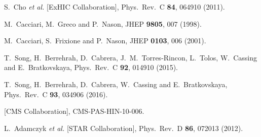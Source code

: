 \documentclass[twocolumn,aps,superscriptaddress,showpacs,nofootinbib,floatfix]{revtex4}
\begin{document}
\begin{thebibliography}{99}
  S.~Cho {\it et al.} [ExHIC Collaboration],
  Phys.\ Rev.\ C {\bf 84}, 064910 (2011).

  M.~Cacciari, M.~Greco and P.~Nason,
  JHEP {\bf 9805}, 007 (1998).

  M.~Cacciari, S.~Frixione and P.~Nason,
  JHEP {\bf 0103}, 006 (2001).

  T.~Song, H.~Berrehrah, D.~Cabrera, J.~M.~Torres-Rincon, L.~Tolos, W.~Cassing and E.~Bratkovskaya,
  Phys.\ Rev.\ C {\bf 92}, 014910 (2015).

  T.~Song, H.~Berrehrah, D.~Cabrera, W.~Cassing and E.~Bratkovskaya,
  Phys.\ Rev.\ C {\bf 93}, 034906 (2016).

  [CMS Collaboration],
  CMS-PAS-HIN-10-006.

  L.~Adamczyk {\it et al.} [STAR Collaboration],
  Phys.\ Rev.\ D {\bf 86}, 072013 (2012).


\end{thebibliography}
\end{document}
